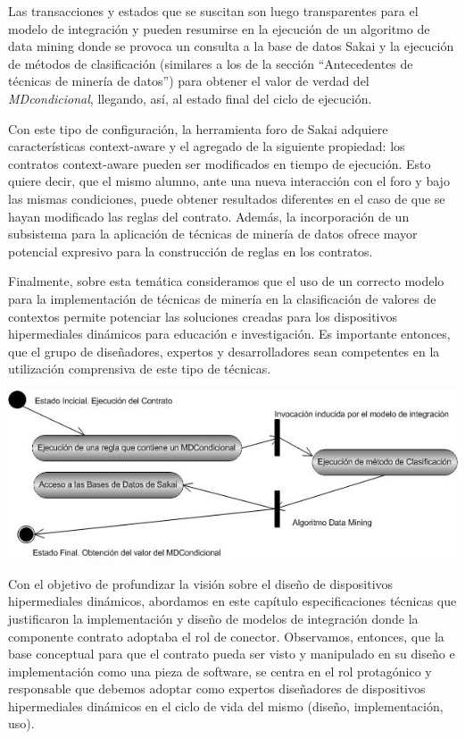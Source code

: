 \begin{itemize}
Las transacciones y estados que se suscitan son luego transparentes para el
modelo de integración y pueden resumirse en la ejecución de un algoritmo de
data mining donde se provoca un consulta a la base de datos Sakai y la ejecución
de métodos de clasificación (similares a los de la sección “Antecedentes
de técnicas de minería de datos”) para obtener el valor de verdad del
\textit{MDcondicional}, llegando, así, al estado final del ciclo de ejecución.


Con este tipo de configuración, la herramienta foro de Sakai adquiere
características context-aware y el agregado de la siguiente propiedad: los contratos
context-aware pueden ser modificados en tiempo de ejecución. Esto
quiere decir, que el mismo alumno, ante una nueva interacción con el foro y
bajo las mismas condiciones, puede obtener resultados diferentes en el caso de
que se hayan modificado las reglas del contrato. Además, la incorporación de
un subsistema para la aplicación de técnicas de minería de datos ofrece mayor
potencial expresivo para la construcción de reglas en los contratos.


Finalmente, sobre esta temática consideramos que el uso de un correcto
modelo para la implementación de técnicas de minería en la clasificación de
valores de contextos permite potenciar las soluciones creadas para los dispositivos
hipermediales dinámicos para educación e investigación. Es importante
entonces, que el grupo de diseñadores, expertos y desarrolladores sean competentes
en la utilización comprensiva de este tipo de técnicas.

\begin{center}
\includegraphics[width=6 in,totalheight=2 in]{Ch4/f4.jpg}
\end{center}



Con el objetivo de profundizar la visión sobre el diseño de dispositivos hipermediales
dinámicos, abordamos en este capítulo especificaciones técnicas que
justificaron la implementación y diseño de modelos de integración donde la
componente contrato adoptaba el rol de conector.
Observamos, entonces, que la base conceptual para que el contrato pueda
ser visto y manipulado en su diseño e implementación como una pieza de software,
se centra en el rol protagónico y responsable que debemos adoptar como
expertos diseñadores de dispositivos hipermediales dinámicos en el ciclo de
vida del mismo (diseño, implementación, uso).


\end{itemize}
